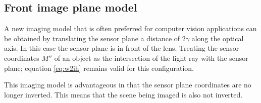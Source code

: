 \subsection{Front image plane model}
A new imaging model that is often preferred for computer vision applications can be obtained by translating the sensor plane a distance of $2\gamma$ along the optical axis. In this case the sensor plane is in front of the lens. Treating the sensor coordinates $M''$ of an object as the intersection of the light ray with the sensor plane; equation \ref{eq:w2ih} remains valid for this configuration.

This imaging model is advantageous in that the sensor plane coordinates are no longer inverted. This means that the scene being imaged is also not inverted.





